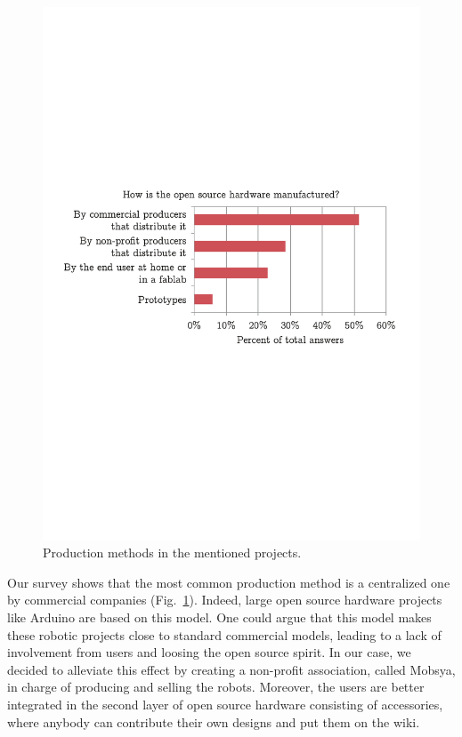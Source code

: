 \documentclass[letterpaper, 10 pt, conference]{ieeeconf}  %
\begin{document}
\begin{figure}
\centering
\includegraphics[width=\columnwidth]{figures/manufacturing}
\caption{Production methods in the mentioned projects.}
\label{fig:production}
\end{figure}

Our survey shows that the most common production method is a centralized one by commercial companies (Fig.~\ref{fig:production}).
Indeed, large open source hardware projects like Arduino are based on this model.
One could argue that this model makes these robotic projects close to standard commercial models, leading to a lack of involvement from users and loosing the open source spirit.
In our case, we decided to alleviate this effect by creating a non-profit association, called Mobsya, in charge of producing and selling the robots. 
Moreover, the users are better integrated in the second layer of open source hardware consisting of accessories, where anybody can contribute their own designs and put them on the wiki.
\end{document}
